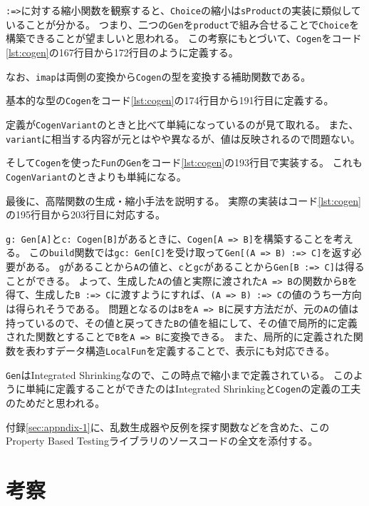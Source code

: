 \documentclass[submit,PRO]{ipsj}
\theoremstyle{definition}
\begin{document}
\texttt{:=>}に対する縮小関数を観察すると、\texttt{Choice}の縮小は\texttt{sProduct}の実装に類似していることが分かる。
つまり、二つの\texttt{Gen}を\texttt{product}で組み合せることで\texttt{Choice}を構築できることが望ましいと思われる。
この考察にもとづいて、\texttt{Cogen}をコード\ref{lst:cogen}の167行目から172行目のように定義する。

なお、\texttt{imap}は両側の変換から\texttt{Cogen}の型を変換する補助関数である。

基本的な型の\texttt{Cogen}をコード\ref{lst:cogen}の174行目から191行目に定義する。

定義が\texttt{CogenVariant}のときと比べて単純になっているのが見て取れる。
また、\texttt{variant}に相当する内容が元とはやや異なるが、値は反映されるので問題ない。

そして\texttt{Cogen}を使った\texttt{Fun}の\texttt{Gen}をコード\ref{lst:cogen}の193行目で実装する。
これも\texttt{CogenVariant}のときよりも単純になる。

最後に、高階関数の生成・縮小手法を説明する。
実際の実装はコード\ref{lst:cogen}の195行目から203行目に対応する。

\texttt{g:\ Gen[A]}と\texttt{c:\ Cogen[B]}があるときに、\texttt{Cogen[A => B]}を構築することを考える。
この\texttt{build}関数では\texttt{gc: Gen[C]}を受け取って\texttt{Gen[(A => B) :=> C]}を返す必要がある。
\texttt{g}があることから\texttt{A}の値と、\texttt{c}と\texttt{gc}があることから\texttt{Gen[B :=> C]}は得ることができる。
よって、生成した\texttt{A}の値と実際に渡された\texttt{A => B}の関数から\texttt{B}を得て、生成した\texttt{B :=> C}に渡すようにすれば、\texttt{(A => B) :=> C}の値のうち一方向は得られそうである。
問題となるのは\texttt{B}を\texttt{A => B}に戻す方法だが、元の\texttt{A}の値は持っているので、その値と戻ってきた\texttt{B}の値を組にして、その値で局所的に定義された関数とすることで\texttt{B}を\texttt{A => B}に変換できる。
また、局所的に定義された関数を表わすデータ構造\texttt{LocalFun}を定義することで、表示にも対応できる。

\texttt{Gen}はIntegrated Shrinkingなので、この時点で縮小まで定義されている。
このように単純に定義することができたのはIntegrated Shrinkingと\texttt{Cogen}の定義の工夫のためだと思われる。

付録\ref{sec:appndix-1}に、乱数生成器や反例を探す関数などを含めた、このProperty Based Testingライブラリのソースコードの全文を添付する。

\section{考察}
\end{document}
